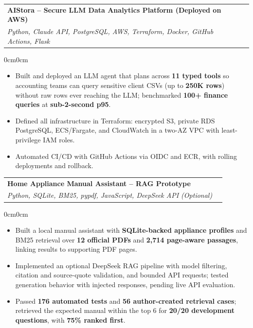 \documentclass[10pt,letterpaper]{article}
\newenvironment{highlights}{
  \begin{itemize}[
    topsep=0.015cm,
    parsep=0cm,
    partopsep=0pt,
    itemsep=0.01cm,
    leftmargin=12pt
  ]
}{
  \end{itemize}
}
\newenvironment{onecolentry}{
  \begin{adjustwidth}{0cm}{0cm}
}{
  \end{adjustwidth}
}
\begin{document}
\begin{tabularx}{\textwidth}{Xr}
  \textbf{AIStora -- Secure LLM Data Analytics Platform (Deployed on AWS)}\\[1pt]
  \textit{Python, Claude API, PostgreSQL, AWS, Terraform, Docker, GitHub Actions, Flask} & \\
\end{tabularx}
 
\begin{onecolentry}
\begin{highlights}
  \item Built and deployed an LLM agent that plans across \textbf{11 typed tools} so accounting teams can query sensitive client CSVs (up to \textbf{250K rows}) without raw rows ever reaching the LLM; benchmarked \textbf{100+ finance queries} at \textbf{sub-2-second p95}.
  \item Defined all infrastructure in Terraform: encrypted S3, private RDS PostgreSQL, ECS/Fargate, and CloudWatch in a two-AZ VPC with least-privilege IAM roles.
  \item Automated CI/CD with GitHub Actions via OIDC and ECR, with rolling deployments and rollback.
\end{highlights}
\end{onecolentry}
 
\vspace{0.04cm}
 
\begin{tabularx}{\textwidth}{Xr}
  \textbf{Home Appliance Manual Assistant -- RAG Prototype}\\[1pt]
  \textit{Python, SQLite, BM25, pypdf, JavaScript, DeepSeek API (Optional)} & \\
\end{tabularx}

\begin{onecolentry}
\begin{highlights}
  \item Built a local manual assistant with \textbf{SQLite-backed appliance profiles} and BM25 retrieval over \textbf{12 official PDFs} and \textbf{2,714 page-aware passages}, linking results to supporting PDF pages.
  \item Implemented an optional DeepSeek RAG pipeline with model filtering, citation and source-quote validation, and bounded API requests; tested generation behavior with injected responses, pending live API evaluation.
  \item Passed \textbf{176 automated tests} and \textbf{56 author-created retrieval cases}; retrieved the expected manual within the top 6 for \textbf{20/20 development questions}, with \textbf{75\% ranked first}.
\end{highlights}
\end{onecolentry}
 
\end{document}
